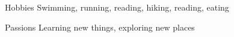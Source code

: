 

\begin{cvskills}

  \cvskill
    {Hobbies} %
    {Swimming, running, reading, hiking, reading, eating} %

  \cvskill
    {Passions} %
    {Learning new things, exploring new places} %

\end{cvskills}